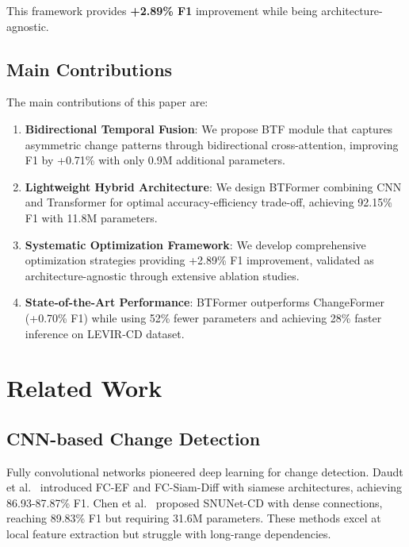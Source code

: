 \documentclass[journal]{IEEEtran}
\begin{document}
This framework provides \textbf{+2.89\% F1} improvement while being architecture-agnostic.

\subsection{Main Contributions}

The main contributions of this paper are:

\begin{enumerate}
    \item \textbf{Bidirectional Temporal Fusion}: We propose BTF module that captures asymmetric change patterns through bidirectional cross-attention, improving F1 by +0.71\% with only 0.9M additional parameters.
    
    \item \textbf{Lightweight Hybrid Architecture}: We design BTFormer combining CNN and Transformer for optimal accuracy-efficiency trade-off, achieving 92.15\% F1 with 11.8M parameters.
    
    \item \textbf{Systematic Optimization Framework}: We develop comprehensive optimization strategies providing +2.89\% F1 improvement, validated as architecture-agnostic through extensive ablation studies.
    
    \item \textbf{State-of-the-Art Performance}: BTFormer outperforms ChangeFormer (+0.70\% F1) while using 52\% fewer parameters and achieving 28\% faster inference on LEVIR-CD dataset.
\end{enumerate}

\section{Related Work}

\subsection{CNN-based Change Detection}

Fully convolutional networks pioneered deep learning for change detection. Daudt et al.~\cite{daudt2018fully} introduced FC-EF and FC-Siam-Diff with siamese architectures, achieving 86.93-87.87\% F1. Chen et al.~\cite{chen2021snunet} proposed SNUNet-CD with dense connections, reaching 89.83\% F1 but requiring 31.6M parameters. These methods excel at local feature extraction but struggle with long-range dependencies.
\end{document}
